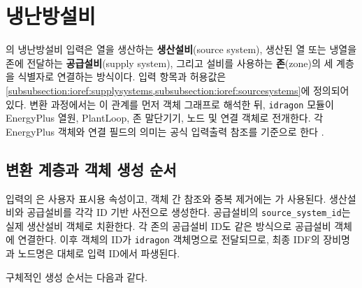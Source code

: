 
\section{냉난방설비}
\label{section:hvac-conversion}

\simulator 의 냉난방설비 입력은  열을 생산하는 \textbf{생산설비}(source system), 생산된 열 또는 냉열을 존에 전달하는 \textbf{공급설비}(supply system), 그리고 설비를 사용하는 \textbf{존}(zone)의 세 계층을 식별자로 연결하는 방식이다. 입력 항목과 허용값은 \cref{subsubsection:ioref:supplysystems,subsubsection:ioref:sourcesystems}에 정의되어 있다. 변환 과정에서는 이 관계를 먼저 \pymodule 객체 그래프로 해석한 뒤, \texttt{idragon} 모듈이 EnergyPlus 열원, PlantLoop, 존 말단기기, 노드 및 연결 객체로 전개한다. 각 EnergyPlus 객체와 연결 필드의 의미는 공식 입력출력 참조를 기준으로 한다 \cite{energyplusior242}.

\subsection{변환 계층과 객체 생성 순서}

입력의 은 사용자 표시용 속성이고, 객체 간 참조와 중복 제거에는 가 사용된다.  생산설비와 공급설비를 각각 ID 기반 사전으로 생성한다. 공급설비의 \texttt{source\_}\allowbreak\texttt{system\_}\allowbreak\texttt{id}는 실제 생산설비 객체로 치환한다. 각 존의 공급설비 ID도 같은 방식으로 공급설비 객체에 연결한다. 이후 \pymodule 객체의 ID가 \texttt{idragon} 객체명으로 전달되므로, 최종 IDF의 장비명과 노드명은 대체로 입력 ID에서 파생된다.

구체적인 생성 순서는 다음과 같다.

